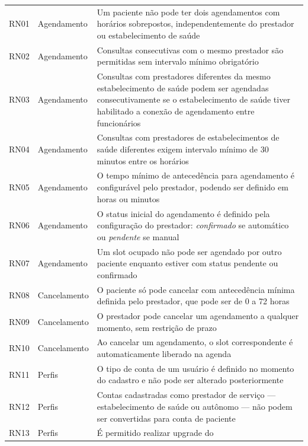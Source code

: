\begin{center}
\begin{longtable}{p{1.2cm}p{3cm}p{7.5cm}}
  RN01 & Agendamento
      & Um paciente não pode ter dois
        agendamentos com horários
        sobrepostos, independentemente
        do prestador ou estabelecimento de saúde \\
  RN02 & Agendamento
      & Consultas consecutivas com o mesmo
        prestador são permitidas sem
        intervalo mínimo obrigatório \\
  RN03 & Agendamento
      & Consultas com prestadores diferentes
        da mesmo estabelecimento de saúde podem ser agendadas
        consecutivamente se o estabelecimento de saúde tiver
        habilitado a conexão de agendamento
        entre funcionários \\
  RN04 & Agendamento
      & Consultas com prestadores de estabelecimentos de saúde
        diferentes exigem intervalo mínimo
        de 30 minutos entre os horários \\
  RN05 & Agendamento
      & O tempo mínimo de antecedência para
        agendamento é configurável pelo
        prestador, podendo ser definido
        em horas ou minutos \\
  RN06 & Agendamento
      & O status inicial do agendamento é
        definido pela configuração do
        prestador: \textit{confirmado} se
        automático ou \textit{pendente}
        se manual \\
  RN07 & Agendamento
      & Um slot ocupado não pode ser
        agendado por outro paciente enquanto
        estiver com status pendente ou
        confirmado \\
  RN08 & Cancelamento
      & O paciente só pode cancelar com
        antecedência mínima definida pelo
        prestador, que pode ser de 0 a
        72 horas \\
  RN09 & Cancelamento
      & O prestador pode cancelar um
        agendamento a qualquer momento,
        sem restrição de prazo \\
  RN10 & Cancelamento
      & Ao cancelar um agendamento, o slot
        correspondente é automaticamente
        liberado na agenda \\
  RN11 & Perfis
      & O tipo de conta de um usuário é
        definido no momento do cadastro
        e não pode ser alterado
        posteriormente \\
  RN12 & Perfis
      & Contas cadastradas como prestador
        de serviço --- estabelecimento de saúde ou autônomo
        --- não podem ser convertidas para
        conta de paciente \\
  RN13 & Perfis
      & É permitido realizar upgrade do

\end{longtable}
\end{center}
